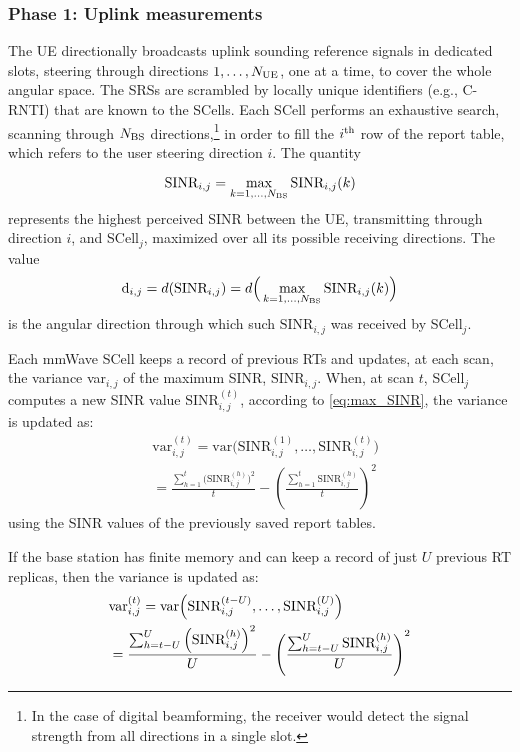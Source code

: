 \documentclass[conference,a4paper]{IEEEtran}
\begin{document}
\subsubsection{Phase 1:  Uplink measurements}

The UE directionally broadcasts uplink sounding reference signals in dedicated slots, steering through directions $1,\dots,N_{\rm UE}$, one  at a time, to cover the whole angular space.
The SRSs are scrambled by locally unique identifiers (e.g., C-RNTI) that are known to the 
SCells. Each SCell performs an exhaustive search, scanning through $N_{\rm BS}$ directions,\footnote{In the case of digital beamforming, the receiver would detect the signal strength from all directions in a single slot.} in order to fill  the $i^{\rm th}$ row of the report table, which refers to the user steering direction $i$. The quantity

\begin{equation}
\text{SINR}_{i,j} = \max_{k=1,\dots,N_{\rm BS}} \text{SINR}_{i,j}(k)
\label{eq:max_SINR}
\end{equation}
represents the highest perceived SINR between the UE, transmitting through direction $i$, and SCell$_j$, maximized over all its possible receiving directions. The value
\begin{equation}
\text{d}_{i,j} = d(\text{SINR}_{i,j}) = d\Big(\max_{k=1,\dots,N_{\rm BS}}  \text{SINR}_{i,j}(k)\Big)
\end{equation}
is the angular direction through which such $\text{SINR}_{i,j}$ was received by SCell$_j$.

Each mmWave SCell 
keeps a record of previous RTs and updates, at each scan, the variance var$_{i,j}$ of the maximum SINR, $\text{SINR}_{i,j}$. When, at scan $t$,  SCell$_j$ computes a new SINR value $\text{SINR}_{i,j}^{(t)}$, according to \eqref{eq:max_SINR}, the variance is updated as:
\begin{equation}
\begin{aligned}
&\text{var}_{i,j}^{(t)} = \text{var} \Big(\text{SINR}_{i,j}^{(1)}, \dots, \text{SINR}_{i,j}^{(t)} \Big) \\ 
& =\frac{ \sum_{h=1}^t \Big(\text{SINR}_{i,j}^{(h)}\Big)^2 }{t} - \left(\frac{ \sum_{h=1}^t \text{SINR}_{i,j}^{{(h)} }}{t}\right)^2
\end{aligned}
\end{equation}
using the SINR values of the previously saved report tables.

If the base station has finite memory and can keep a record of just $U$ previous RT replicas, then the variance is updated as:
\begin{align}
&\text{var}_{i,j}^{(t)} = \text{var} \Big(\text{SINR}_{i,j}^{(t-U)}, \dots, \text{SINR}_{i,j}^{(U)} \Big) \\ 
& =\frac{ \sum_{h=t-U}^U \Big(\text{SINR}_{i,j}^{(h)}\Big)^2 }{U} - \left(\frac{ \sum_{h=t-U}^U \text{SINR}_{i,j}^{(h)} }{U}\right)^2 \notag
\end{align}
\end{document}
